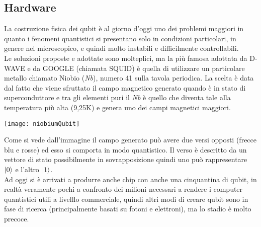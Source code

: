 \subsection{Hardware}
La costruzione fisica dei qubit è al giorno d'oggi uno dei problemi maggiori in quanto i fenomeni quantistici si presentano solo in condizioni particolari, in genere nel microscopico, e quindi molto instabili e difficilmente controllabili.\\
Le soluzioni proposte e adottate sono molteplici, ma la più famosa adottata da D-WAVE e da GOOGLE (chiamata SQUID) è quella di utilizzare un particolare metallo chiamato Niobio (\textit{Nb}), numero 41 sulla tavola periodica.
La scelta è data dal fatto che viene sfruttato il campo magnetico generato quando è in stato di superconduttore e tra gli elementi puri il \textit{Nb} è quello che diventa tale alla temperatura più alta (9,25K) e genera uno dei campi magnetici maggiori.\\
\begin{center}
\texttt{[image: niobiumQubit]}
\end{center} 
Come si vede dall'immagine il campo generato può avere due versi opposti (frecce blu e rosse) ed esso si comporta in modo quantistico. Il verso è descritto da un vettore di stato possibilmente in sovrapposizione quindi uno può rappresentare $\ket{0}$ e l'altro $\ket{1}$.\\
Ad oggi si è arrivati a produrre anche chip con anche una cinquantina di qubit, in realtà veramente pochi a confronto dei milioni necessari a rendere i computer quantistici utili a livelllo commerciale, quindi altri modi di creare qubit sono in fase di ricerca (principalmente basati su fotoni e elettroni), ma lo stadio è molto precoce.

